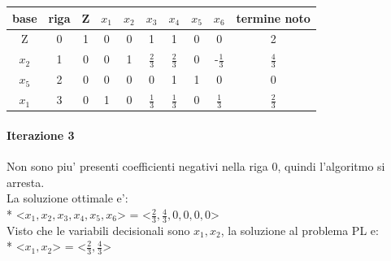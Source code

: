 \documentclass[a4paper,12pt,oneside]{article}
\begin{document}
    \begin{center}
        \begin{tabular}{|c|c|c|c|c|c|c|c|c|c|}
            \hline
            base  & riga & Z & $x_1$ & $x_2$        & $x_3$        & $x_4$        & $x_5$ & $x_6$        & termine noto \\
            \hline
            Z     & 0    & 1 &  0    & 0            &  1           &  1           &  0    & 0            & 2 \\
            $x_2$ & 1    & 0 &  0    & 1            &  $\frac 2 3$ &  $\frac 2 3$ &  0    & -$\frac 1 3$ & $\frac 4 3$ \\
            $x_5$ & 2    & 0 &  0    & 0            &  0           &  1           &  1    & 0            &  0 \\
            $x_1$ & 3    & 0 &  1    & 0            &  $\frac 1 3$ &  $\frac 1 3$ &  0    &  $\frac 1 3$ & $\frac 2 3$ \\
            \hline
        \end{tabular}
    \end{center}

    \paragraph{Iterazione 3}

    Non sono piu' presenti coefficienti negativi nella riga 0, quindi l'algoritmo si arresta. \\

    La soluzione ottimale e': \\*
    <$x_1, x_2, x_3, x_4, x_5, x_6$> = <$\frac 2 3, \frac 4 3, 0, 0, 0, 0$> \\

    Visto che le variabili decisionali sono $x_1, x_2$, la soluzione al problema PL e: \\*
    <$x_1, x_2$> = <$\frac 2 3, \frac 4 3$> \\
   
\end{document}

